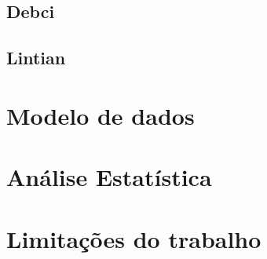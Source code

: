 \subsection{Debci}

\subsection{Lintian}

\section{Modelo de dados}

\section{Análise Estatística}

\section{Limitações do trabalho}
